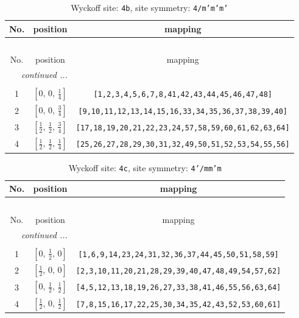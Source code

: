 \documentclass[fleqn,8pt]{jsarticle}
\begin{document}
\begin{longtable}{ccc}
\caption{Wyckoff site: {\tt 4b}, site symmetry: {\tt 4/m'm'm'}}
 \\
 \hline \hline
No. & position & mapping \\ \hline \endfirsthead

\multicolumn{2}{l}{\tablename\ \thetable{}} \\
 \hline \hline
No. & position & mapping \\ \hline \endhead

 \hline \hline
\multicolumn{2}{r}{\footnotesize\it continued ...} \\ \endfoot

 \hline \hline
\multicolumn{2}{r}{} \\ \endlastfoot

1 & $\left[ 0,\, 0,\, \frac{1}{4} \right]$ & {\tt [1,2,3,4,5,6,7,8,41,42,43,44,45,46,47,48]} \\ \hline
2 & $\left[ 0,\, 0,\, \frac{3}{4} \right]$ & {\tt [9,10,11,12,13,14,15,16,33,34,35,36,37,38,39,40]} \\ \hline
3 & $\left[ \frac{1}{2},\, \frac{1}{2},\, \frac{3}{4} \right]$ & {\tt [17,18,19,20,21,22,23,24,57,58,59,60,61,62,63,64]} \\ \hline
4 & $\left[ \frac{1}{2},\, \frac{1}{2},\, \frac{1}{4} \right]$ & {\tt [25,26,27,28,29,30,31,32,49,50,51,52,53,54,55,56]} \\
\end{longtable}
\renewcommand{\arraystretch}{1.2}
\begin{longtable}{ccc}
\caption{Wyckoff site: {\tt 4c}, site symmetry: {\tt 4'/mm'm}}
 \\
 \hline \hline
No. & position & mapping \\ \hline \endfirsthead

\multicolumn{2}{l}{\tablename\ \thetable{}} \\
 \hline \hline
No. & position & mapping \\ \hline \endhead

 \hline \hline
\multicolumn{2}{r}{\footnotesize\it continued ...} \\ \endfoot

 \hline \hline
\multicolumn{2}{r}{} \\ \endlastfoot

1 & $\left[ 0,\, \frac{1}{2},\, 0 \right]$ & {\tt [1,6,9,14,23,24,31,32,36,37,44,45,50,51,58,59]} \\ \hline
2 & $\left[ \frac{1}{2},\, 0,\, 0 \right]$ & {\tt [2,3,10,11,20,21,28,29,39,40,47,48,49,54,57,62]} \\ \hline
3 & $\left[ 0,\, \frac{1}{2},\, \frac{1}{2} \right]$ & {\tt [4,5,12,13,18,19,26,27,33,38,41,46,55,56,63,64]} \\ \hline
4 & $\left[ \frac{1}{2},\, 0,\, \frac{1}{2} \right]$ & {\tt [7,8,15,16,17,22,25,30,34,35,42,43,52,53,60,61]} \\
\end{longtable}
\end{document}
